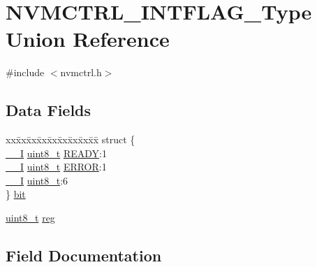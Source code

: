 \hypertarget{union_n_v_m_c_t_r_l___i_n_t_f_l_a_g___type}{}\section{N\+V\+M\+C\+T\+R\+L\+\_\+\+I\+N\+T\+F\+L\+A\+G\+\_\+\+Type Union Reference}
\label{union_n_v_m_c_t_r_l___i_n_t_f_l_a_g___type}


{\ttfamily \#include $<$nvmctrl.\+h$>$}

\subsection*{Data Fields}
\begin{DoxyCompactItemize}
\item 
\begin{tabbing}
xx\=xx\=xx\=xx\=xx\=xx\=xx\=xx\=xx\=\kill
struct \{\\
\>\mbox{\hyperlink{core__cm0plus_8h_af63697ed9952cc71e1225efe205f6cd3}{\_\_I}} \mbox{\hyperlink{union_n_v_m_c_t_r_l___i_n_t_f_l_a_g___type_a5b4208c6f4c4a4290c4f2804d1eb1d5b}{uint8\_t}} \mbox{\hyperlink{union_n_v_m_c_t_r_l___i_n_t_f_l_a_g___type_a7571a2b3407b72baa0f60aae0efa49c6}{READY}}:1\\
\>\mbox{\hyperlink{core__cm0plus_8h_af63697ed9952cc71e1225efe205f6cd3}{\_\_I}} \mbox{\hyperlink{union_n_v_m_c_t_r_l___i_n_t_f_l_a_g___type_a5b4208c6f4c4a4290c4f2804d1eb1d5b}{uint8\_t}} \mbox{\hyperlink{union_n_v_m_c_t_r_l___i_n_t_f_l_a_g___type_ab083f63120ce20369e2dbb0081da16e3}{ERROR}}:1\\
\>\mbox{\hyperlink{core__cm0plus_8h_af63697ed9952cc71e1225efe205f6cd3}{\_\_I}} \mbox{\hyperlink{union_n_v_m_c_t_r_l___i_n_t_f_l_a_g___type_a5b4208c6f4c4a4290c4f2804d1eb1d5b}{uint8\_t}}:6\\
\} \mbox{\hyperlink{union_n_v_m_c_t_r_l___i_n_t_f_l_a_g___type_a17ca619af5c858b7a42991addb8548a4}{bit}}\\

\end{tabbing}\item 
\mbox{\hyperlink{union_n_v_m_c_t_r_l___i_n_t_f_l_a_g___type_a5b4208c6f4c4a4290c4f2804d1eb1d5b}{uint8\+\_\+t}} \mbox{\hyperlink{union_n_v_m_c_t_r_l___i_n_t_f_l_a_g___type_a9428adc9af4653a2050e2536b55dec8d}{reg}}
\end{DoxyCompactItemize}


\subsection{Field Documentation}
\mbox{\label{union_n_v_m_c_t_r_l___i_n_t_f_l_a_g___type_a17ca619af5c858b7a42991addb8548a4}} 
